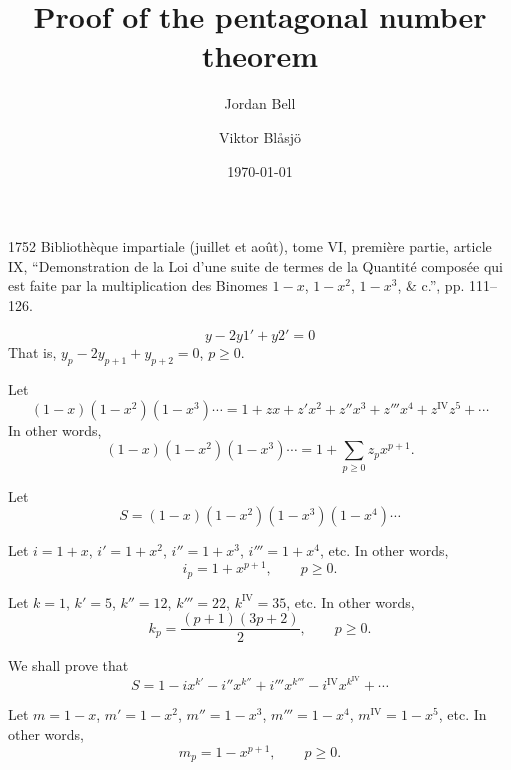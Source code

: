 \documentclass{amsart}
\theoremstyle{definition}
\begin{document}
\title{Proof of the pentagonal number theorem}
\author{Jordan Bell}
\address{Department of Mathematics, University of Toronto, Toronto, Ontario, Canada}
\author{Viktor Bl{\aa}sj{\"o}}
\address{Mathematisch Instituut, Universiteit Utrecht, Utrecht, The Netherlands}
\date{\today}


\maketitle

1752 Biblioth\`eque impartiale (juillet et ao\^ut), tome VI, premi\`ere partie, article
IX, ``Demonstration de la Loi d'une suite de termes de la Quantit\'e compos\'ee qui
est faite par la multiplication des Binomes $1-x$, $1-x^2$, $1-x^3$, \& c.'', pp. 111–126.

\[
y-2y1'+y2'=0
\]
That is, $y_p-2y_{p+1}+y_{p+2}=0$, $p \geq 0$. 

Let
\[
(1-x)(1-x^2)(1-x^3)\cdots = 1+zx+z'x^2+z''x^3+z'''x^4+z^{\textrm{IV}}z^5+\cdots
\]
In other words,
\[
(1-x)(1-x^2)(1-x^3)\cdots = 1 + \sum_{p \geq 0} z_p x^{p+1}.
\]

Let
\[
S=(1-x)(1-x^2)(1-x^3)(1-x^4)\cdots
\]

Let $i=1+x$, $i'=1+x^2$, $i''=1+x^3$, $i'''=1+x^4$, etc.
In other words,
\[
i_p=1+x^{p+1},\qquad p \geq 0.
\]

Let
$k=1$, $k'=5$, $k''=12$, $k'''=22$, $k^{\textrm{IV}}=35$, etc.
In other words,
\[
k_p=\frac{(p+1)(3p+2)}{2}, \qquad p \geq 0.
\]

We shall prove that 
\[
S=1-ix^{k'}-i''x^{k''}+i'''x^{k'''}-i^{\textrm{IV}}x^{k^{\textrm{IV}}}+\cdots
\]

Let $m=1-x$, $m'=1-x^2$, $m''=1-x^3$, $m'''=1-x^4$, $m^{\textrm{IV}}=1-x^5$, etc.
In other words,
\[
m_p=1-x^{p+1}, \qquad p\geq 0.
\]




%
%
\end{document}
